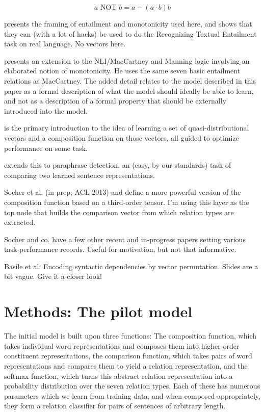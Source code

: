 \documentclass[12pt,leqno,tbtags,twoside]{article}
\theoremstyle{dotless}
\begin{document}
\begin{equation}
a \text{~NOT~} b = a - (a \cdot b)b
\end{equation}

\citet{maccartney2009extended} \citep[from Bill's dissertation][]{maccartney2009natural} presents the framing of entailment and monotonicity used here, and shows that they can (with a lot of hacks) be used to do the Recognizing Textual Entailment task on real language. No vectors here.

\citet{icard2012inclusion} presents an extension to the NLI/MacCartney and Manning logic involving an elaborated notion of monotonicity. He uses the same seven basic entailment relations as MacCartney. The added detail relates to the model described in this paper as a formal description of what the model should ideally be able to learn, and not as a description of a formal property that should be externally introduced into the model.

\citet{socher2011semi} is the primary introduction to the idea of learning a set of quasi-distributional vectors and a composition function on those vectors, all guided to optimize performance on some task.

\citet{socher2011dynamic} extends this to paraphrase detection, an (easy, by our standards) task of comparing two learned sentence representations.

Socher et al. (in prep; ACL 2013) and \citet{chen2013learning} define a more powerful version of the composition function based on a third-order tensor. I'm using this layer as the top node that builds the comparison vector from which relation types are extracted.

Socher and co. have a few other recent and in-progress papers setting various task-performance records. Useful for motivation, but not that informative.



Basile et al: Encoding syntactic dependencies by vector permutation. Slides are a bit vague. Give it a closer look!

\section{Methods: The pilot model}

The initial model is built upon three functions: The composition function, which takes individual word representations and composes them into higher-order constituent representations, the comparison function, which takes pairs of word representations and compares them to yield a relation representation, and the softmax function, which turns this abstract relation representation into a probability distribution over the seven relation types. Each of these has numerous parameters which we learn from training data, and when composed appropriately, they form a relation classifier for pairs of sentences of arbitrary length. 
\end{document}
